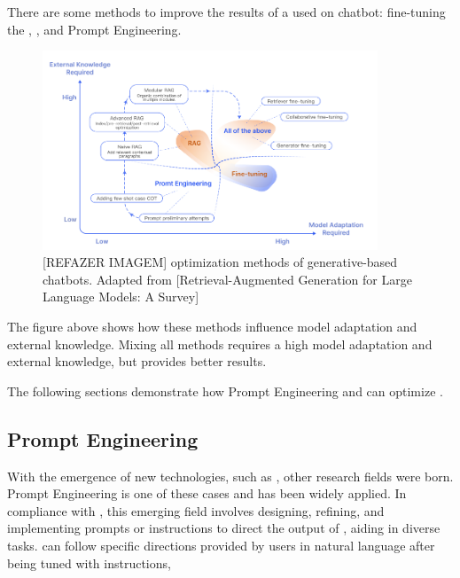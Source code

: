 
There are some methods to improve the results of a {\llm} used on chatbot: fine-tuning the {\llm}, {\rag}, and Prompt Engineering.

\begin{figure}[ht]
    \includegraphics[width=10cm]{figs/chapter2/otimization_generative_chatbot.png}
    \centering
    \caption{[REFAZER IMAGEM] optimization methods of generative-based chatbots. Adapted from [Retrieval-Augmented Generation for Large Language Models: A Survey]}
\end{figure}

The figure above shows how these methods influence model adaptation and external knowledge. Mixing all methods requires a high model adaptation and external knowledge, but provides better results. 

The following sections demonstrate how Prompt Engineering and {\rag} can optimize {\llm}.



\subsection{Prompt Engineering}

With the emergence of new technologies, such as {\llm}, other research fields were born. Prompt Engineering is one of these cases and has been widely applied. In compliance with \citet{mesko_prompt_2023}, this emerging field involves designing, refining, and implementing prompts or instructions to direct the output of {\llm}, aiding in diverse tasks. {\llm} can follow specific directions provided by users in natural language after being tuned with instructions,


